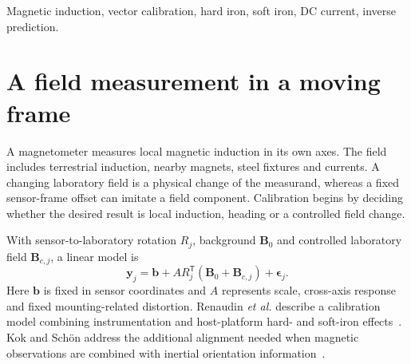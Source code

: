\begin{abstract}
Magnetic reorientation, local field change and indirect current measurement share an observable but require different references. We combine two vector-field examples with a fixed-geometry current example. The LSM9DS1 norm changes by approximately $0.971\unit{\mu T}$ on reorientation, while corrected MAG3110 initial and reoriented means are 48.337 and $48.363\unit{\mu T}$. These patterns diagnose different consistency properties without ranking device accuracy. A current-step reduction gives sensitivity $0.02012\unit{A/\mu T}$ and a single-reading scatter scale of 7.2~mA. The analysis separates vector calibration, assigned current states and the field-derived current reduction. Absolute induction, geographic heading and current accuracy each require reference information absent from a stable norm alone.
\end{abstract}
\begin{IEEEkeywords}
Magnetic induction, vector calibration, hard iron, soft iron, DC current, inverse prediction.
\end{IEEEkeywords}

\section{A field measurement in a moving frame}
A magnetometer measures local magnetic induction in its own axes. The field includes terrestrial induction, nearby magnets, steel fixtures and currents. A changing laboratory field is a physical change of the measurand, whereas a fixed sensor-frame offset can imitate a field component. Calibration begins by deciding whether the desired result is local induction, heading or a controlled field change.

With sensor-to-laboratory rotation $R_j$, background $\bm B_0$ and controlled laboratory field $\bm B_{c,j}$, a linear model is
\begin{equation}
 \bm y_j=\bm b+A R_j^\mathsf T(\bm B_0+\bm B_{c,j})+\bm\epsilon_j.
 \label{eq:mag-model}
\end{equation}
Here $\bm b$ is fixed in sensor coordinates and $A$ represents scale, cross-axis response and fixed mounting-related distortion. Renaudin \emph{et al.} describe a calibration model combining instrumentation and host-platform hard- and soft-iron effects~\cite{renaudin2010}. Kok and Sch\"on address the additional alignment needed when magnetic observations are combined with inertial orientation information~\cite{kok2016}.

